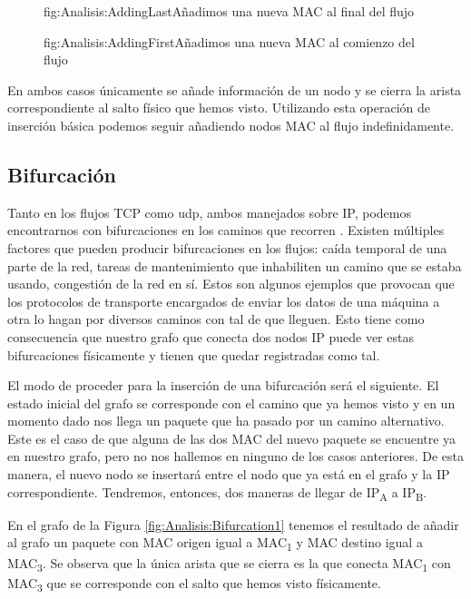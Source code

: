 \documentclass[tfg,epsbased,lof,lot,loa,covers,final,copyright,overleaf]{tfgtfmthesisuam}
\begin{document}
\begin{figure}[Ejemplo inserción básica 1]{fig:Analisis:AddingLast}{Añadimos una nueva MAC al final del flujo}
    
\end{figure}
\begin{figure}[Ejemplo inserción básica 2]{fig:Analisis:AddingFirst}{Añadimos una nueva MAC al comienzo del flujo}
    
\end{figure}

En ambos casos únicamente se añade información de un nodo y se cierra la arista correspondiente al salto físico que hemos visto. Utilizando esta operación de inserción básica podemos seguir añadiendo nodos MAC al flujo indefinidamente.

\subsection{Bifurcación}
Tanto en los flujos TCP como \gls{udp}, ambos manejados sobre IP, podemos encontrarnos con bifurcaciones en los caminos que recorren \cite{Priya}. Existen múltiples factores que pueden producir bifurcaciones en los flujos: caída temporal de una parte de la red, tareas de mantenimiento que inhabiliten un camino que se estaba usando, congestión de la red en sí. Estos son algunos ejemplos que provocan que los protocolos de transporte encargados de enviar los datos de una máquina a otra lo hagan por diversos caminos con tal de que lleguen. Esto tiene como consecuencia que nuestro grafo que conecta dos nodos IP puede ver estas bifurcaciones físicamente y tienen que quedar registradas como tal.

El modo de proceder para la inserción de una bifurcación será el siguiente. El estado inicial del grafo se corresponde con el camino que ya hemos visto y en un momento dado nos llega un paquete que ha pasado por un camino alternativo. Este es el caso de que alguna de las dos MAC del nuevo paquete se encuentre ya en nuestro grafo, pero no nos hallemos en ninguno de los casos anteriores. De esta manera, el nuevo nodo se insertará entre el nodo que ya está en el grafo y la IP correspondiente. Tendremos, entonces, dos maneras de llegar de IP\textsubscript{A} a IP\textsubscript{B}.

En el grafo de la Figura \ref{fig:Analisis:Bifurcation1} tenemos el resultado de añadir al grafo un paquete con MAC origen igual a MAC\textsubscript{1} y MAC destino igual a MAC\textsubscript{3}. Se observa que la única arista que se cierra es la que conecta MAC\textsubscript{1} con MAC\textsubscript{3} que se corresponde con el salto que hemos visto físicamente.
\end{document}

